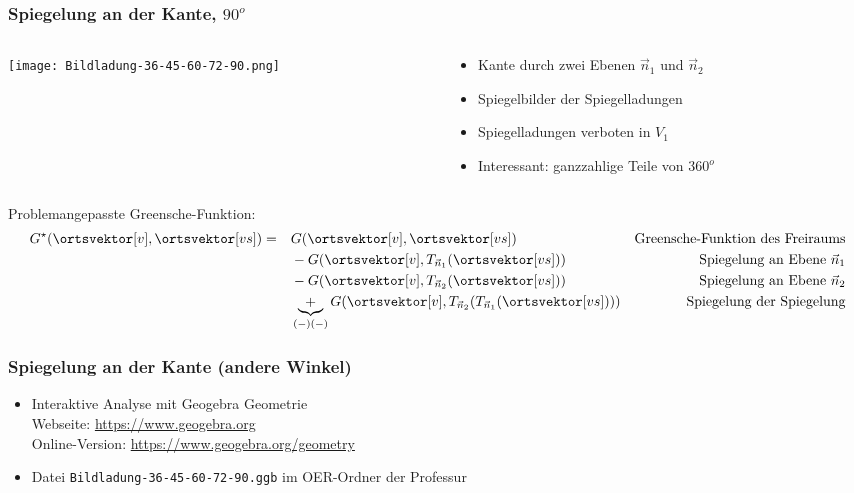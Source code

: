 \begin{frame}
  \frametitle{Spiegelung an der Kante, $90^o$}

  \begin{columns}
    \begin{column}{.5\textwidth}
      \texttt{[image: Bildladung-36-45-60-72-90.png]}
      \end{column}
      \begin{column}{.45\textwidth}
        \begin{itemize}[<+->]
        \item Kante durch zwei Ebenen $\vec{n}_1$ und $\vec{n}_2$
        \item Spiegelbilder der Spiegelladungen
        \item Spiegelladungen verboten in $V_1$
          \item Interessant: ganzzahlige Teile von $360^o$
          \end{itemize}
      \end{column}
    \end{columns}
    \pause
    Problemangepasste Greensche-Funktion:
    \begin{align*}
      G^\star(\ortsvektor[v], \ortsvektor[vs])  =\quad & G (\ortsvektor[v], \ortsvektor[vs]) & \text{Greensche-Funktion des Freiraums} \\
      & - G (\ortsvektor[v], T_{\vec{n}_1}(\ortsvektor[vs])) & \text{Spiegelung an Ebene } \vec{n}_1\\ 
                                               & - G (\ortsvektor[v], T_{\vec{n}_2}(\ortsvektor[vs])) & \text{Spiegelung an Ebene } \vec{n}_2\\
     & \underbrace{+}_{(-)( -)}  G (\ortsvektor[v], T_{\vec{n}_2}(T_{\vec{n}_1}(\ortsvektor[vs]))) & \text{Spiegelung der Spiegelung}
  \end{align*}
\end{frame}


\begin{frame}
  \frametitle{Spiegelung an der Kante (andere Winkel)}
  \begin{itemize}[<+->]
  \item Interaktive Analyse mit \alert{Geogebra Geometrie}\\
    Webseite: \url{https://www.geogebra.org}\\
    Online-Version: \url{https://www.geogebra.org/geometry}
    \item Datei \texttt{Bildladung-36-45-60-72-90.ggb} im OER-Ordner der Professur
  \end{itemize}
\end{frame}


